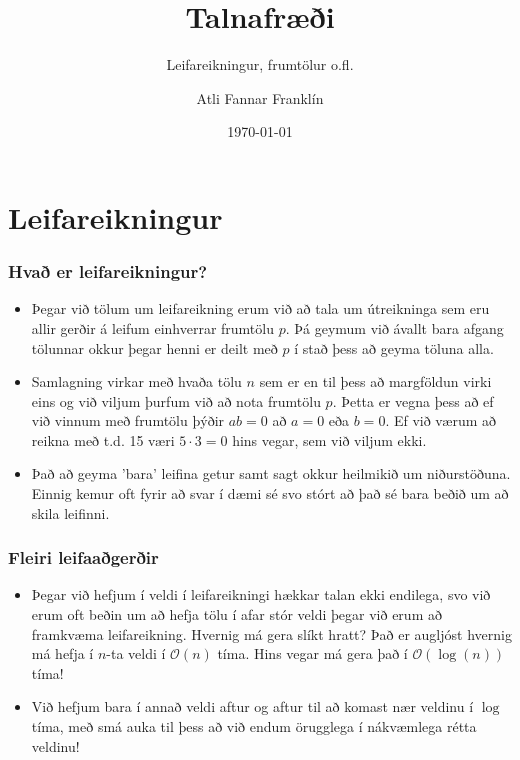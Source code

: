 \documentclass{beamer}
\title{Talnafræði}
\subtitle{Leifareikningur, frumtölur o.fl.}
\author{Atli Fannar Franklín}
\date{\today}
\begin{document}
\frame{\titlepage}

\section[Leifareikningur]{Leifareikningur}

\begin{frame}
\frametitle{Hvað er leifareikningur?}

\begin{itemize}

\item<1-> Þegar við tölum um leifareikning erum við að tala um útreikninga sem eru allir gerðir á leifum einhverrar frumtölu $p$. Þá geymum við ávallt bara afgang tölunnar okkur þegar henni er deilt með $p$ í stað þess að geyma töluna alla.

\item<2-> Samlagning virkar með hvaða tölu $n$ sem er en til þess að margföldun virki eins og við viljum þurfum við að nota frumtölu $p$. Þetta er vegna þess að ef við vinnum með frumtölu þýðir $ab = 0$ að $a = 0$ eða $b = 0$. Ef við værum að reikna með t.d. 15 væri $5 \cdot 3 = 0$ hins vegar, sem við viljum ekki.

\item<3-> Það að geyma 'bara' leifina getur samt sagt okkur heilmikið um niðurstöðuna. Einnig kemur oft fyrir að svar í dæmi sé svo stórt að það sé bara beðið um að skila leifinni.
\end{itemize}

\end{frame}

\begin{frame}
\frametitle{Fleiri leifaaðgerðir}

\begin{itemize}

\item<1-> Þegar við hefjum í veldi í leifareikningi hækkar talan ekki endilega, svo við erum oft beðin um að hefja tölu í afar stór veldi þegar við erum að framkvæma leifareikning. Hvernig má gera slíkt hratt? Það er augljóst hvernig má hefja í $n$-ta veldi í $\mathcal{O}(n)$ tíma. Hins vegar má gera það í $\mathcal{O}(\log(n))$ tíma!

\item<2-> Við hefjum bara í annað veldi aftur og aftur til að komast nær veldinu í $\log$ tíma, með smá auka til þess að við endum örugglega í nákvæmlega rétta veldinu!

\end{itemize}

\end{frame}
\end{document}
